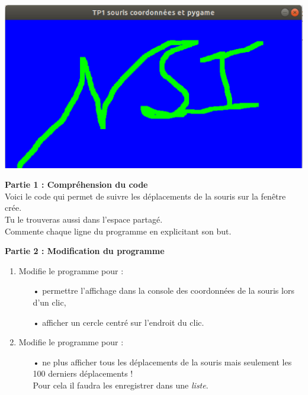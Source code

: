 \documentclass[11pt,a4paper,twoside]{article}
\begin{document}
\begin{center}
\end{center}
\vskip0.5cm
 
\begin{center}
\includegraphics[scale=0.6]{TP1-capture.eps}
\end{center}

\noindent \textbf{Partie 1 : Compréhension du code}\\

Voici le code qui permet de suivre les déplacements de la souris sur la fenêtre crée.\\
Tu le trouveras aussi dans l'espace partagé.\\
Commente chaque ligne du programme en explicitant son but.\\

\begin{center}
\begin{minipage}{16cm}

\end{minipage}
\end{center}
\newpage
\noindent \textbf{Partie 2 : Modification du programme}\\

\noindent 
\begin{enumerate}
\item Modifie le programme pour :\begin{itemize}
\item[•] permettre l'affichage dans la console des coordonnées de la souris lors d'un clic,
\item[•] afficher un cercle centré sur l'endroit du clic.
\end{itemize}
\item Modifie le programme pour :\begin{itemize}
\item[•] ne plus afficher tous les déplacements de la souris mais seulement les 100 derniers déplacements !\\Pour cela il faudra les enregistrer dans une \textsl{liste}.\\
\end{itemize}
\end{enumerate}
\end{document}
